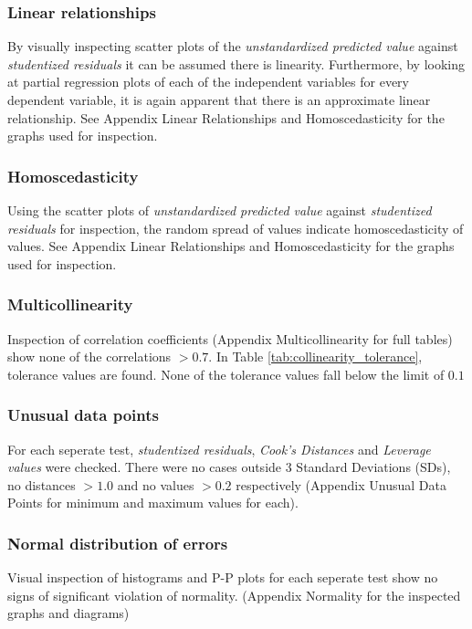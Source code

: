 \documentclass{sigchi}
\begin{document}
\subsubsection{Linear relationships}
By visually inspecting scatter plots of the \textit{unstandardized predicted value} against \textit{studentized residuals} it can be assumed there is linearity. Furthermore, by looking at partial regression plots of each of the independent variables for every dependent variable, it is again apparent that there is an approximate linear relationship. See Appendix Linear Relationships and Homoscedasticity for the graphs used for inspection.

\subsubsection{Homoscedasticity}
Using the scatter plots of \textit{unstandardized predicted value} against \textit{studentized residuals} for inspection, the random spread of values indicate homoscedasticity of values. See Appendix Linear Relationships and Homoscedasticity for the graphs used for inspection.

\subsubsection{Multicollinearity}
Inspection of correlation coefficients (Appendix Multicollinearity for full tables) show none of the correlations $> 0.7$. In Table \ref{tab:collinearity_tolerance}, tolerance values are found. None of the tolerance values fall below the limit of $0.1$


\subsubsection{Unusual data points} %
\label{subsub:unusual_data_points}
For each seperate test, \textit{studentized residuals}, \textit{Cook's Distances} and \textit{Leverage values} were checked. There were no cases outside 3 Standard Deviations (SDs), no distances $> 1.0$ and no values $> 0.2$ respectively (Appendix Unusual Data Points for minimum and maximum values for each).

\subsubsection{Normal distribution of errors} %
\label{subsub:normal_distribution_of_errors}
Visual inspection of histograms and P-P plots for each seperate test show no signs of significant violation of normality. (Appendix Normality for the inspected graphs and diagrams)
\end{document}
